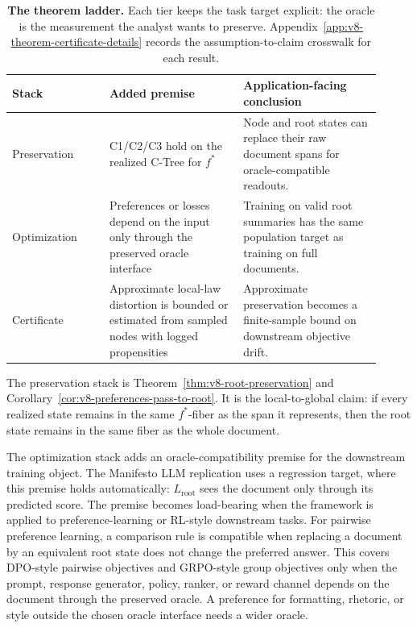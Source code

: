 \begin{table}[t]
\centering
\small
\begin{tabular}{@{}p{0.24\linewidth}p{0.33\linewidth}p{0.34\linewidth}@{}}
\toprule
Stack & Added premise & Application-facing conclusion \\
\midrule
Preservation & C1/C2/C3 hold on the realized C-Tree for \(f^\ast\) &
Node and root states can replace their raw document spans for
oracle-compatible readouts. \\
Optimization & Preferences or losses depend on the input only through the
preserved oracle interface &
Training on valid root summaries has the same population target as training
on full documents. \\
Certificate & Approximate local-law distortion is bounded or estimated from
sampled nodes with logged propensities &
Approximate preservation becomes a finite-sample bound on downstream
objective drift. \\
\bottomrule
\end{tabular}
\caption{\textbf{The theorem ladder.} Each tier keeps the task target
explicit: the oracle is the measurement the analyst wants to preserve.
Appendix~\ref{app:v8-theorem-certificate-details} records the
assumption-to-claim crosswalk for each result.}
\label{tab:v8-theorem-ladder}
\end{table}

The preservation stack is Theorem~\ref{thm:v8-root-preservation} and
Corollary~\ref{cor:v8-preferences-pass-to-root}. It is the
local-to-global claim: if every realized state remains in the same
\(f^\ast\)-fiber as the span it represents, then the root state
remains in the same fiber as the whole document.

The optimization stack adds an oracle-compatibility premise for the
downstream training object. The Manifesto LLM replication uses a
regression target, where this premise holds automatically:
\(L_{\mathrm{root}}\) sees the document only through its predicted
score. The premise becomes load-bearing when the framework is
applied to preference-learning or RL-style downstream tasks. For
pairwise preference learning, a comparison rule is compatible when
replacing a document by an equivalent root state does not change
the preferred answer. This covers DPO-style pairwise objectives
\citep{BradleyTerry1952,RafailovEtAl2023DPO} and GRPO-style group
objectives only when the prompt, response generator, policy,
ranker, or reward channel depends on the document through the
preserved oracle. A preference for formatting, rhetoric, or style
outside the chosen oracle interface needs a wider oracle.

